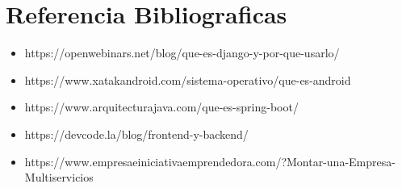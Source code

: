 \chapter{Referencia Bibliograficas}
\begin{itemize}
	\item https://openwebinars.net/blog/que-es-django-y-por-que-usarlo/ 
	\item
	https://www.xatakandroid.com/sistema-operativo/que-es-android 
	\item https://www.arquitecturajava.com/que-es-spring-boot/
	\item https://devcode.la/blog/frontend-y-backend/
	\item https://www.empresaeiniciativaemprendedora.com/?Montar-una-Empresa-Multiservicios
\end{itemize}